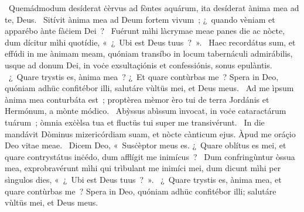 \psalmChapterWithInscription{}
{ }
{%
~Quemádmodum desíderat ċèrvus ad fòntes aquárum, ita desíderat ànima mea ad te, Deus. 
~Sitívit ànima mea ad Deum fortem vivum~; ¿~quando vèniam et apparébo ànte fàċiem Dei~? 
~Fuérunt mìhi làcrymae meae panes die ac nòcte, dum dícitur mìhi quotídie, «~¿~Ubi est Deus tuus~?~». 
~Haec recordátus sum, et effúdi in me ànimam meam, quóniam transíbo in locum tabernáculi admirábilis, usque ad donum Dei, in voċe exsultaçiónis et confessiónis, sonus epulàntis. 
~¿~Quare trystis es, ànima mea~? ¿~Et quare contùrbas me~? Spera in Deo, quóniam adhüc confitébor illi, salutáre vùltüs mei, et Deus meus. 
~Ad me ìpsum ànima mea conturbáta est~; proptèrea mèmor èro tui de terra Jordánis et Hermónum, a mònte módico. 
~Abỳssus abìssum ìnvocat, in voċe cataractárum tuárum~; òmnia exċèlsa tua et fluctüs tui super me transivérunt. 
~In die mandávit Dòminus mizericórdiam suam, et nòcte cànticum ejus. Àpud me oráçio Deo vitae meae. 
~Dicem Deo, «~Susċèptor meus es. ¿~Quare oblítus es mei, et quare contrystátus inċédo, dum afflígit me inimícus~? 
~Dum confringùntur òssua mea, exprobravérunt mìhi qui trìbulant me inimíci mei, dum dicunt mìhi per sìngulos dies, «~¿~Ubi est Deus tuus~?~». 
~¿~Quare trystis es, ànima mea, et quare contùrbas me~? Spera in Deo, quóniam adhüc confitébor illi; salutáre vùltüs mei, et Deus meus. 
}
